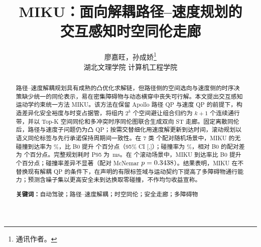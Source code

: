 \documentclass[a4paper,zihao=5]{ctexart}
\title{MIKU：面向解耦路径--速度规划的\\交互感知时空同伦走廊}
\author{廖嘉旺，孙成娇\thanks{通讯作者。}\\[2pt]\normalsize 湖北文理学院 计算机工程学院}
\date{}
\theoremstyle{definition}
\begin{document}
\maketitle

\begin{abstract}
\small
\noindent
路径--速度解耦规划具有成熟的凸优化求解链，但路径侧的空间选向与速度侧的时序决策缺少统一的同伦表示，易在密集障碍物与动态横穿中丧失可行解。本文提出交互感知运动学约束统一方法 MIKU。该方法在保留 Apollo 路径 QP 与速度 QP 的前提下，构造差异化安全裕度与时变占据管，将组内 $2^k$ 个空间避让组合归约为 $k+1$ 个连续通行带，并以 Top-K 空间同伦和多冲突时序同伦图联合生成双向 ST 走廊。固定离散同伦后，路径与速度子问题仍为凸 QP；按需交替细化用速度解更新到达时间，滚动规划以语义同伦标签与先行承诺保持周期间一致性。在 7 类 \RandCaseCount 个配对随机场景中，MIKU 的无碰撞到达率为 \RandAllMikuSuccessPct\%，比 B0 提升 \RandAllMikuVsBZeroSuccessDiff 个百分点（95\% CI [\RandAllMikuVsBZeroSuccessCiLow,\RandAllMikuVsBZeroSuccessCiHigh]）；碰撞率为 \RandAllMikuCollisionPct\%，相对 B0 的配对差为 \RandAllMikuVsBZeroCollisionDiff 个百分点。完整规划耗时 P95 为 \RandAllMikuRuntimePninetyfive\,ms。在 \ClosedCaseCount 个滚动场景中，MIKU 到达率比 B0 提升 \ClosedMikuVsBZeroSuccessDiff 个百分点；碰撞率差异不显著（配对 McNemar $p=0.3438$）。结果表明，MIKU 在不替换现有解耦 QP 的条件下，在声明的有限标签域与运动契约下提高了多障碍物通行能力；预测含噪子集以更高安全未到达换取零碰撞，不作均匀收益宣称。

\vspace{0.5em}
\noindent\textbf{关键词：}自动驾驶；路径--速度解耦；时空同伦；安全走廊；多障碍物
\end{abstract}


\printbibliography[heading=bibintoc,title={参考文献}]
\end{document}
